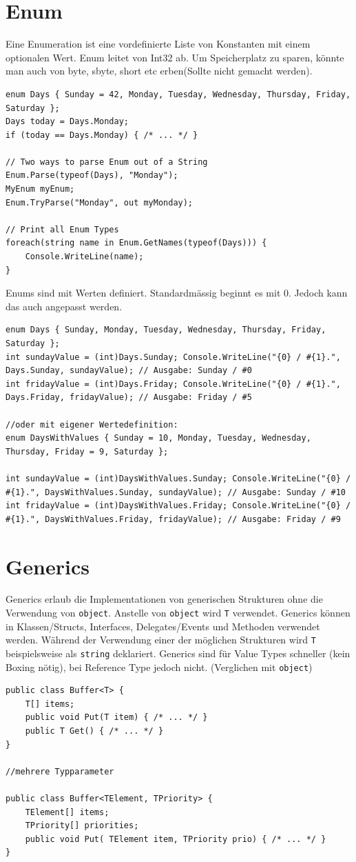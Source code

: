 \documentclass[
a4paper,
oneside,
10pt,
fleqn,
headsepline,
toc=listofnumbered, 
bibliography=totocnumbered]{scrartcl}
\let\stdsection\section
\renewcommand\section{\clearpage\stdsection}
\begin{document}
\section{Enum}
Eine Enumeration ist eine vordefinierte Liste von Konstanten mit einem optionalen Wert. Enum leitet von Int32 ab. Um Speicherplatz zu sparen, könnte man auch von byte, sbyte, short etc erben(Sollte nicht gemacht werden).
\begin{lstlisting}
enum Days { Sunday = 42, Monday, Tuesday, Wednesday, Thursday, Friday, Saturday };
Days today = Days.Monday;
if (today == Days.Monday) { /* ... */ }

// Two ways to parse Enum out of a String
Enum.Parse(typeof(Days), "Monday");
MyEnum myEnum;
Enum.TryParse("Monday", out myMonday);

// Print all Enum Types
foreach(string name in Enum.GetNames(typeof(Days))) {
	Console.WriteLine(name);
}
\end{lstlisting}
Enums sind mit Werten definiert. Standardmässig beginnt es mit 0. Jedoch kann das auch angepasst werden.

\begin{lstlisting}
enum Days { Sunday, Monday, Tuesday, Wednesday, Thursday, Friday, Saturday };
int sundayValue = (int)Days.Sunday; Console.WriteLine("{0} / #{1}.", Days.Sunday, sundayValue); // Ausgabe: Sunday / #0
int fridayValue = (int)Days.Friday; Console.WriteLine("{0} / #{1}.", Days.Friday, fridayValue); // Ausgabe: Friday / #5 

//oder mit eigener Wertedefinition:
enum DaysWithValues { Sunday = 10, Monday, Tuesday, Wednesday, Thursday, Friday = 9, Saturday }; 

int sundayValue = (int)DaysWithValues.Sunday; Console.WriteLine("{0} / #{1}.", DaysWithValues.Sunday, sundayValue); // Ausgabe: Sunday / #10
int fridayValue = (int)DaysWithValues.Friday; Console.WriteLine("{0} / #{1}.", DaysWithValues.Friday, fridayValue); // Ausgabe: Friday / #9 
\end{lstlisting}


\section{Generics}
Generics erlaub die Implementationen von generischen Strukturen ohne die Verwendung von \lstinline|object|. Anstelle von \lstinline|object| wird \lstinline|T| verwendet.
Generics können in Klassen/Structs, Interfaces, Delegates/Events und Methoden verwendet werden. Während der Verwendung einer der möglichen Strukturen wird \lstinline|T| beispielsweise als \lstinline|string| deklariert.  Generics sind für Value Types schneller (kein Boxing nötig), bei Reference Type jedoch nicht. (Verglichen mit \lstinline|object|)
\begin{lstlisting}
public class Buffer<T> {
	T[] items;
	public void Put(T item) { /* ... */ }
	public T Get() { /* ... */ }
}

//mehrere Typparameter

public class Buffer<TElement, TPriority> {
    TElement[] items; 
    TPriority[] priorities; 
    public void Put( TElement item, TPriority prio) { /* ... */ } 
} 
\end{lstlisting}
\end{document}
